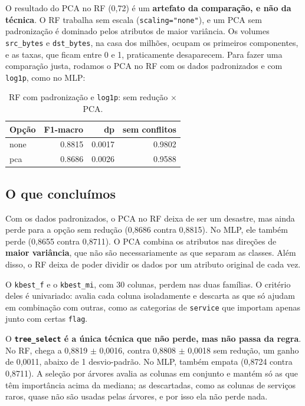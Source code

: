 \documentclass[11pt,a4paper]{article}
\begin{document}
O resultado do PCA no RF (0,72) é um \textbf{artefato da comparação, e não da técnica}. O RF trabalha sem escala (\texttt{scaling="none"}), e um PCA sem padronização é dominado pelos atributos de maior variância. Os volumes \texttt{src\_bytes} e \texttt{dst\_bytes}, na casa dos milhões, ocupam os primeiros componentes, e as taxas, que ficam entre 0 e 1, praticamente desaparecem. Para fazer uma comparação justa, rodamos o PCA no RF com os dados padronizados e com \texttt{log1p}, como no MLP:

\begin{table}[H]
\centering
\caption{RF com padronização e \texttt{log1p}: sem redução $\times$ PCA.}
\begin{tabular}{lrrr}
\toprule
Opção & F1-macro & dp & sem conflitos \\
\midrule
none & 0.8815 & 0.0017 & 0.9802 \\
pca & 0.8686 & 0.0026 & 0.9588 \\
\bottomrule
\end{tabular}
\end{table}

\subsection{O que concluímos}

Com os dados padronizados, o PCA no RF deixa de ser um desastre, mas ainda perde para a opção sem redução (0,8686 contra 0,8815). No MLP, ele também perde (0,8655 contra 0,8711). O PCA combina os atributos nas direções de \textbf{maior variância}, que não são necessariamente as que separam as classes. Além disso, o RF deixa de poder dividir os dados por um atributo original de cada vez.

O \texttt{kbest\_f} e o \texttt{kbest\_mi}, com 30 colunas, perdem nas duas famílias. O critério deles é univariado: avalia cada coluna isoladamente e descarta as que só ajudam em combinação com outras, como as categorias de \texttt{service} que importam apenas junto com certas \texttt{flag}.

O \textbf{\texttt{tree\_select} é a única técnica que não perde, mas não passa da regra}. No RF, chega a 0,8819 $\pm$ 0,0016, contra 0,8808 $\pm$ 0,0018 sem redução, um ganho de 0,0011, abaixo de 1 desvio-padrão. No MLP, também empata (0,8724 contra 0,8711). A seleção por árvores avalia as colunas em conjunto e mantém só as que têm importância acima da mediana; as descartadas, como as colunas de serviços raros, quase não são usadas pelas árvores, e por isso ela não perde nada.
\end{document}
